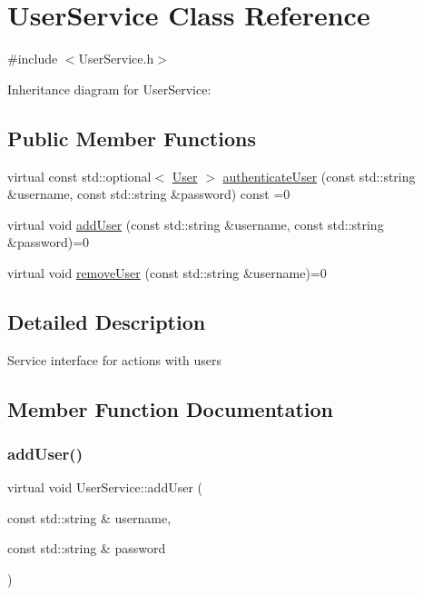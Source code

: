 \hypertarget{classUserService}{}\section{User\+Service Class Reference}
\label{classUserService}


{\ttfamily \#include $<$User\+Service.\+h$>$}



Inheritance diagram for User\+Service\+:
\subsection*{Public Member Functions}
\begin{DoxyCompactItemize}
\item 
virtual const std\+::optional$<$ \hyperlink{classUser}{User} $>$ \hyperlink{classUserService_ae98e5e71adb53af6fdafb270a766f512}{authenticate\+User} (const std\+::string \&username, const std\+::string \&password) const =0
\item 
virtual void \hyperlink{classUserService_a7eb582fe91a2a83a433dbe461a2f1457}{add\+User} (const std\+::string \&username, const std\+::string \&password)=0
\item 
virtual void \hyperlink{classUserService_aab158c8d9ed5c8cf7d62b762d62ea9b4}{remove\+User} (const std\+::string \&username)=0
\end{DoxyCompactItemize}


\subsection{Detailed Description}
Service interface for actions with users 

\subsection{Member Function Documentation}
\mbox{\label{classUserService_a7eb582fe91a2a83a433dbe461a2f1457}} 
\subsubsection{\texorpdfstring{add\+User()}{addUser()}}
{\footnotesize\ttfamily virtual void User\+Service\+::add\+User (\begin{DoxyParamCaption}\item[{const std\+::string \&}]{username,  }\item[{const std\+::string \&}]{password }\end{DoxyParamCaption})\hspace{0.3cm}{\ttfamily [pure virtual]}}

